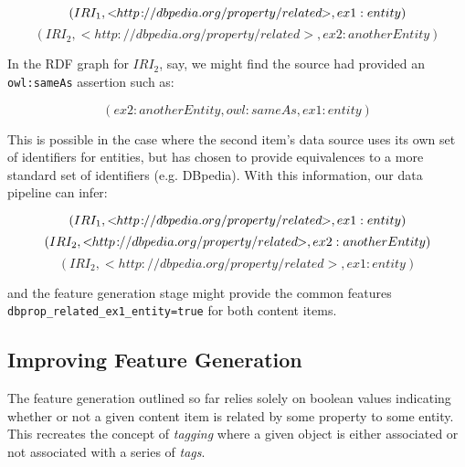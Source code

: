 \begin{displaymath}
(IRI_{1}, <\!\!http\!:\!\!//dbpedia.org/property/related\!\!>, ex1:entity)\\
\end{displaymath}
\begin{displaymath}
(IRI_{2}, <\!\!http\!:\!\!//dbpedia.org/property/related\!\!>, ex2:anotherEntity)
\end{displaymath}

In the RDF graph for $IRI_2$, say, we might find the source had provided an
\texttt{owl:sameAs} assertion such as:

\begin{displaymath}
(ex2:anotherEntity, owl:sameAs, ex1:entity)
\end{displaymath}

This is possible in the case where the second item's data source uses its own
set of identifiers for entities, but has chosen to provide equivalences to
a more standard set of identifiers (e.g. DBpedia). With this information,
our data pipeline can infer:

\begin{displaymath}
(IRI_{1}, <\!\!http\!:\!\!//dbpedia.org/property/related\!\!>, ex1:entity)\\
\end{displaymath}
\begin{displaymath}
(IRI_{2}, <\!\!http\!:\!\!//dbpedia.org/property/related\!\!>, ex2:anotherEntity)\\
\end{displaymath}
\begin{displaymath}
(IRI_{2}, <\!\!http\!:\!\!//dbpedia.org/property/related\!\!>, ex1:entity)
\end{displaymath}

\noindent and the feature generation stage might provide the common features
\texttt{dbprop\_related\_ex1\_entity=true} for both content items.

\subsection{Improving Feature Generation}

The feature generation outlined so far relies solely on boolean values
indicating whether or not a given content item is related by some property to
some entity. This recreates the concept of \emph{tagging} where a given
object is either associated or not associated with a series of \emph{tags}.

